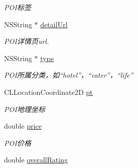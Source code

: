 \begin{DoxyCompactItemize}
\begin{DoxyCompactList}\small\item\em P\+O\+I标签 \end{DoxyCompactList}\item 
\hypertarget{interface_b_m_k_poi_detail_result_a8924119cef8b6d48c481d030101b6c56}{}N\+S\+String $\ast$ \hyperlink{interface_b_m_k_poi_detail_result_a8924119cef8b6d48c481d030101b6c56}{detail\+Url}\label{interface_b_m_k_poi_detail_result_a8924119cef8b6d48c481d030101b6c56}

\begin{DoxyCompactList}\small\item\em P\+O\+I详情页url. \end{DoxyCompactList}\item 
\hypertarget{interface_b_m_k_poi_detail_result_abfb97cc8a340caec03111dd31d97e65e}{}N\+S\+String $\ast$ \hyperlink{interface_b_m_k_poi_detail_result_abfb97cc8a340caec03111dd31d97e65e}{type}\label{interface_b_m_k_poi_detail_result_abfb97cc8a340caec03111dd31d97e65e}

\begin{DoxyCompactList}\small\item\em P\+O\+I所属分类，如“hotel”，“cater”，“life” \end{DoxyCompactList}\item 
\hypertarget{interface_b_m_k_poi_detail_result_a3c136c46389101d6709a4b5393c7849c}{}C\+L\+Location\+Coordinate2\+D \hyperlink{interface_b_m_k_poi_detail_result_a3c136c46389101d6709a4b5393c7849c}{pt}\label{interface_b_m_k_poi_detail_result_a3c136c46389101d6709a4b5393c7849c}

\begin{DoxyCompactList}\small\item\em P\+O\+I地理坐标 \end{DoxyCompactList}\item 
\hypertarget{interface_b_m_k_poi_detail_result_afd147e5aaa946583f1873cc650440fa1}{}double \hyperlink{interface_b_m_k_poi_detail_result_afd147e5aaa946583f1873cc650440fa1}{price}\label{interface_b_m_k_poi_detail_result_afd147e5aaa946583f1873cc650440fa1}

\begin{DoxyCompactList}\small\item\em P\+O\+I价格 \end{DoxyCompactList}\item 
\hypertarget{interface_b_m_k_poi_detail_result_a1b23bf2d013b1391ef11074e0d208873}{}double \hyperlink{interface_b_m_k_poi_detail_result_a1b23bf2d013b1391ef11074e0d208873}{overall\+Rating}\label{interface_b_m_k_poi_detail_result_a1b23bf2d013b1391ef11074e0d208873}


\end{DoxyCompactItemize}
